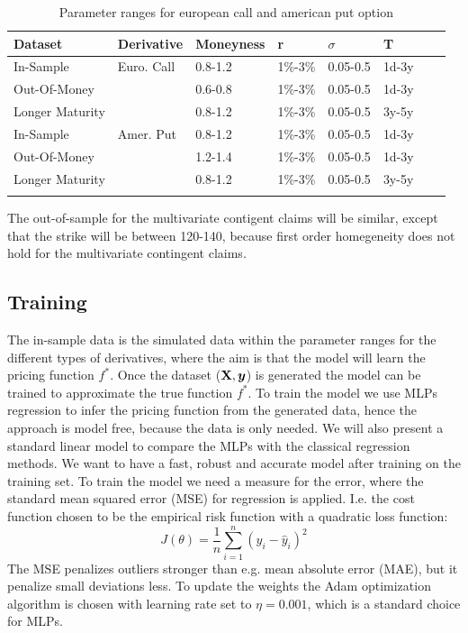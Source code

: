 \begin{table}[H]
\caption{Parameter ranges for european call and american put option}
\label{tab:totalVanillaParRange}
\centering
\begin{tabular}{l l l l l l l l }
\toprule
\textbf{Dataset} & Derivative &\textbf{Moneyness} & \textbf{r} & \textbf{$\sigma$} & \textbf{T} \\
\midrule
In-Sample & Euro. Call & 0.8-1.2 & 1\%-3\% & 0.05-0.5 & 1d-3y\\ 
Out-Of-Money & & 0.6-0.8 & 1\%-3\% & 0.05-0.5 & 1d-3y\\ 
Longer Maturity & & 0.8-1.2 & 1\%-3\% & 0.05-0.5 & 3y-5y\\ 
In-Sample & Amer. Put & 0.8-1.2 & 1\%-3\% & 0.05-0.5 & 1d-3y\\ 
Out-Of-Money & & 1.2-1.4 & 1\%-3\% & 0.05-0.5 & 1d-3y\\ 
Longer Maturity & & 0.8-1.2 & 1\%-3\% & 0.05-0.5 & 3y-5y\\ 
\bottomrule\\
\end{tabular}
\end{table}
The out-of-sample for the multivariate contigent claims will be similar, except that the strike will be between 120-140, because first order homegeneity does not hold for the multivariate contingent claims.



\subsection{Training}
The in-sample data is the simulated data within the parameter ranges for the different types of derivatives, where the aim is that the model will learn the pricing function $f^*$. Once the dataset ($\mathbf{X}, \bm{y}$) is generated the model can be trained to approximate the true function $f^*$. To train the model we use MLPs regression to infer the pricing function from the generated data, hence the approach is model free, because the data is only needed. We will also present a standard linear model to compare the MLPs with the classical regression methods. We want to have a fast, robust and accurate model after training on the training set. To train the model we need a measure for the error, where the standard mean squared error (MSE) for regression is applied. I.e. the cost function chosen to be the empirical risk function with a quadratic loss function:
$$J(\theta)= \frac{1}{n} \sum_{i=1}^{n}(y_i-\hat{y}_i)^2$$
The MSE penalizes outliers stronger than e.g. mean absolute error (MAE), but it penalize small deviations less. To update the weights the Adam optimization algorithm is chosen with learning rate set to $\eta=0.001$, which is a standard choice for MLPs. \\

